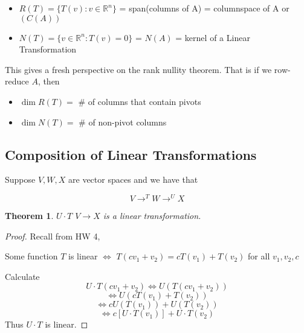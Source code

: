 \documentclass{article}
\newtheorem{theorem}{Theorem}[section]
\newtheorem{one minute paper}[theorem]{One Minute Paper}
\begin{document}
\begin{itemize}
    \item $R(T) = \{T(v) : v \in \mathbb{R}^n\}$ = span(columns of A) = columnspace of A or $(C(A))$
    \item $N(T) = \{v \in \mathbb{R}^n : T(v) = 0 \}$ = $N(A)$ = kernel of a Linear Transformation
\end{itemize}

This gives a fresh perspective on the rank nullity theorem. That is if we row-reduce $A$, then 
\begin{itemize}
    \item $\dim R(T) = $ \# of columns that contain pivots 
    \item $\dim N(T) = $ \# of non-pivot columns
\end{itemize}

\subsection*{Composition of Linear Transformations}
Suppose $V,W,X$ are vector spaces and we have that 

\begin{equation}
    V \rightarrow^T W \rightarrow^U X
\end{equation}

\begin{theorem}
    $U \cdot T$ $V \rightarrow X$ is a linear transformation. 
\end{theorem}

\begin{proof}
    Recall from HW 4, 
    \begin{center}
        Some function $T$ is linear $\iff$ $T(cv_1 + v_2) = cT(v_1) + T(v_2)$ for all $v_1,v_2,c$
    \end{center}
    Calculate
    \begin{equation}
        U\cdot T(cv_1 + v_2) \iff U(T(cv_1 + v_2))
    \end{equation}
    \begin{equation}
        \iff U(cT(v_1) + T(v_2))
    \end{equation}
    \begin{equation}
        \iff cU(T(v_1)) + U(T(v_2))
    \end{equation}
    \begin{equation}
        \iff c[U \cdot T(v_1)] + U \cdot T(v_2)
    \end{equation}
    Thus $U \cdot T$ is linear. 
\end{proof}
\end{document}
